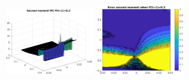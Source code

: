 \documentclass[aspectratio=169]{beamer}\usepackage[utf8]{inputenc}
\begin{document}
\begin{frame}
\begin{figure}[ht!]
\includegraphics[width=0.3\textwidth]{../../MATLAB_Files/Results/moments/lamperti/errors/sm_MC_2.eps}\quad
\includegraphics[width=0.3\textwidth]{../../MATLAB_Files/Results/moments/lamperti/errors/sm_2.eps}
\end{figure}

\end{frame}
\end{document}

